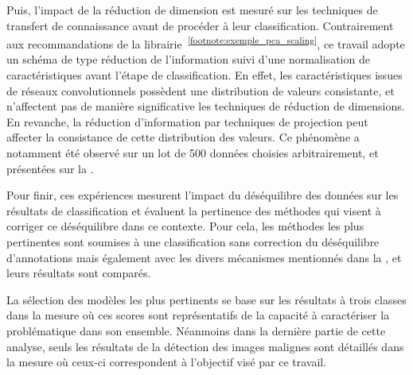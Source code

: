 Puis, l'impact de la réduction de dimension est mesuré sur les techniques de transfert de connaissance avant de procéder à leur classification. Contrairement aux recommandations de la librairie~\textsuperscript{\ref{footnote:exemple_pca_scaling}}, ce travail adopte un schéma de type réduction de l'information suivi d'une normalisation de caractéristiques avant l'étape de classification. En effet, les caractéristiques issues de réseaux convolutionnels possèdent une distribution de valeurs consistante, et n'affectent pas de manière significative les techniques de réduction de dimensions. En revanche, la réduction d'information par techniques de projection peut affecter la consistance de cette distribution des valeurs. Ce phénomène a notamment été observé sur un lot de 500 données choisies arbitrairement, et présentées sur la .\par

Pour finir, ces expériences mesurent l'impact du déséquilibre des données sur les résultats de classification et évaluent la pertinence des méthodes qui visent à corriger ce déséquilibre dans ce contexte. Pour cela, les méthodes les plus pertinentes sont soumises à une classification sans correction du déséquilibre d'annotations mais également avec les divers mécanismes mentionnés dans la , et leurs résultats sont comparés.\par

La sélection des modèles les plus pertinents se base sur les résultats à trois classes dans la mesure où ces scores sont représentatifs de la capacité à caractériser la problématique dans son ensemble. Néanmoins dans la dernière partie de cette analyse, seuls les résultats de la détection des images malignes sont détaillés dans la mesure où ceux-ci correspondent à l'objectif visé par ce travail.\par

\addtocounter{footnote}{1}
\clearpage

